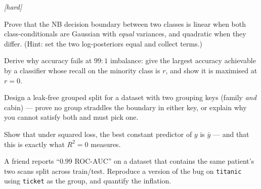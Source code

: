 \emph{[hard]}
\begin{exercise}
Prove that the NB decision boundary between two classes is linear when
both class-conditionals are Gaussian with \emph{equal} variances, and
quadratic when they differ. (Hint: set the two log-posteriors equal and
collect terms.)
\end{exercise}
\begin{exercise}
Derive why accuracy fails at $99{:}1$ imbalance: give the largest
accuracy achievable by a classifier whose recall on the minority class
is $r$, and show it is maximised at $r{=}0$.
\end{exercise}
\begin{exercise}
Design a leak-free grouped split for a dataset with two grouping keys
(family \emph{and} cabin) --- prove no group straddles the boundary in
either key, or explain why you cannot satisfy both and must pick one.
\end{exercise}
\begin{exercise}
Show that under squared loss, the best constant predictor of $y$ is
$\bar y$ --- and that this is exactly what $R^2{=}0$ measures.
\end{exercise}
\begin{exercise}
A friend reports ``$0.99$ ROC-AUC'' on a dataset that contains the same
patient's two scans split across train/test. Reproduce a version of the
bug on \texttt{titanic} using \texttt{ticket} as the group, and quantify
the inflation.
\end{exercise}

